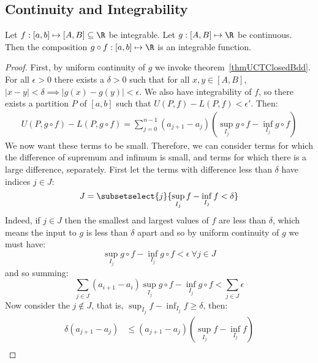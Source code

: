 \documentclass[../Main.tex]{subfiles}
\begin{document}
\subsection{Continuity and Integrability}
\begin{theorem}
    Let $f : [a, b] \mapsto [A, B] \subseteq \R$ be integrable. Let $g : [A, B] \mapsto \R$ be continuous. Then the composition $g \circ f : [a, b] \mapsto \R$ is an integrable function.
    \label{thmCtsComposeIBL}
\end{theorem}
\begin{proof}
    First, by uniform continuity of $g$ we invoke theorem~\ref{thmUCTClosedBdd}. For all $\epsilon > 0$ there exists a $\delta > 0$ such that for all $x, y \in [A, B]$, $|x - y| < \delta \implies |g(x) - g(y)| < \epsilon$.
    We also have integrability of $f$, so there exists a partition $P$ of $[a, b]$ such that $U(P, f) - L(P, f) < \epsilon'$. Then:
    \begin{align*}
        U(P, g\circ f) - L(P, g \circ f) = \sum_{j=0}^{n - 1} (a_{j+1} - a_j) \left(\sup_{I_j} g\circ f - \inf_{I_j} g \circ f\right)
    \end{align*}
    We now want these terms to be small. Therefore, we can consider terms for which the difference of supremum and infimum is small, and terms for which there is a large difference, separately. First let the terms with difference less than $\delta$ have indices $j \in J$:
    \begin{equation*}
        J = \subsetselect{j}{\sup_{I_j} f - \inf_{I_j} f < \delta}
    \end{equation*}
    Indeed, if $j \in J$ then the smallest and largest values of $f$ are less than $\delta$, which means the input to $g$ is less than $\delta$ apart and so by uniform continuity of $g$ we must have:
    \begin{equation*}
        \sup_{I_j} g\circ f - \inf_{I_j} g\circ f < \epsilon~\forall j \in J
    \end{equation*}
    and so summing:
    \begin{equation}
        \sum_{j \in J} (a_{i+1} - a_i) \sup_{I_j} g\circ f - \inf_{I_j} g\circ f < \sum_{j \in J} \epsilon
        \label{eqnContinuityBound}
    \end{equation}
    Now consider the $j \notin J$, that is, $\sup_{I_j} f - \inf_{I_j} f \geq \delta$, then:
    \begin{align*}
        \delta (a_{j+1} - a_j) &\leq (a_{j+1} - a_j) \left(\sup_{I_j} f - \inf_{I_j} f\right) \\

\end{align*}
\end{proof}
\end{document}
